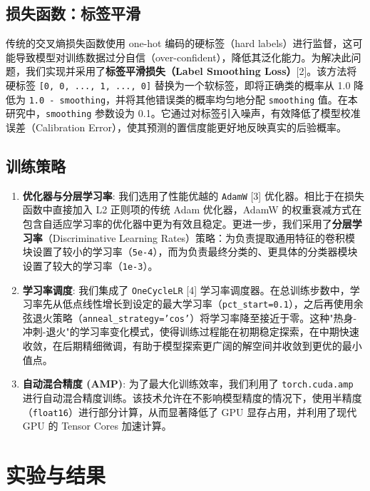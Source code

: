 \documentclass[UTF8]{ctexart}
\begin{document}
\subsection{损失函数：标签平滑}

传统的交叉熵损失函数使用 one-hot 编码的硬标签（hard labels）进行监督，这可能导致模型对训练数据过分自信（over-confident），降低其泛化能力。为解决此问题，我们实现并采用了\textbf{标签平滑损失（Label Smoothing Loss）}[2]。该方法将硬标签 \texttt{[0, 0, ..., 1, ..., 0]} 替换为一个软标签，即将正确类的概率从 1.0 降低为 \texttt{1.0 - smoothing}，并将其他错误类的概率均匀地分配 \texttt{smoothing} 值。在本研究中，\texttt{smoothing} 参数设为 0.1。它通过对标签引入噪声，有效降低了模型校准误差（Calibration Error），使其预测的置信度能更好地反映真实的后验概率。

\subsection{训练策略}

\begin{enumerate}
    \item \textbf{优化器与分层学习率}: 我们选用了性能优越的 \texttt{AdamW} [3] 优化器。相比于在损失函数中直接加入 L2 正则项的传统 Adam 优化器，AdamW 的权重衰减方式在包含自适应学习率的优化器中更为有效且稳定。更进一步，我们采用了\textbf{分层学习率}（Discriminative Learning Rates）策略：为负责提取通用特征的卷积模块设置了较小的学习率（\texttt{5e-4}），而为负责最终分类的、更具体的分类器模块设置了较大的学习率（\texttt{1e-3}）。
    \item \textbf{学习率调度}: 我们集成了 \texttt{OneCycleLR} [4] 学习率调度器。在总训练步数中，学习率先从低点线性增长到设定的最大学习率（\texttt{pct\_start=0.1}），之后再使用余弦退火策略（\texttt{anneal\_strategy='cos'}）将学习率降至接近于零。这种"热身-冲刺-退火"的学习率变化模式，使得训练过程能在初期稳定探索，在中期快速收敛，在后期精细微调，有助于模型探索更广阔的解空间并收敛到更优的最小值点。
    \item \textbf{自动混合精度 (AMP)}: 为了最大化训练效率，我们利用了 \texttt{torch.cuda.amp} 进行自动混合精度训练。该技术允许在不影响模型精度的情况下，使用半精度（\texttt{float16}）进行部分计算，从而显著降低了 GPU 显存占用，并利用了现代 GPU 的 Tensor Cores 加速计算。
\end{enumerate}

\section{实验与结果}
\end{document}
